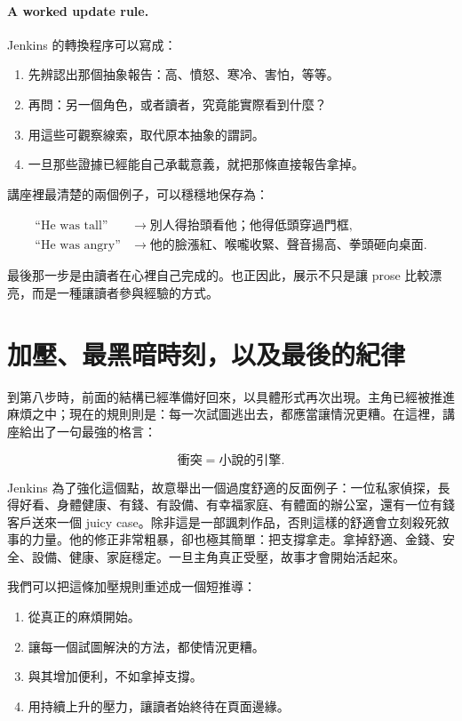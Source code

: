 \paragraph{A worked update rule.} Jenkins 的轉換程序可以寫成：

\begin{enumerate}
\item 先辨認出那個抽象報告：高、憤怒、寒冷、害怕，等等。
\item 再問：另一個角色，或者讀者，究竟能實際看到什麼？
\item 用這些可觀察線索，取代原本抽象的謂詞。
\item 一旦那些證據已經能自己承載意義，就把那條直接報告拿掉。
\end{enumerate}

講座裡最清楚的兩個例子，可以穩穩地保存為：

\begin{align}
\text{``He was tall''} &\to \text{別人得抬頭看他；他得低頭穿過門框},\\
\text{``He was angry''} &\to \text{他的臉漲紅、喉嚨收緊、聲音揚高、拳頭砸向桌面}.
\end{align}

最後那一步是由讀者在心裡自己完成的。也正因此，展示不只是讓 prose 比較漂亮，而是一種讓讀者參與經驗的方式。

\section{加壓、最黑暗時刻，以及最後的紀律}

到第八步時，前面的結構已經準備好回來，以具體形式再次出現。主角已經被推進麻煩之中；現在的規則則是：每一次試圖逃出去，都應當讓情況更糟。在這裡，講座給出了一句最強的格言：

\begin{equation}
\text{衝突}=\text{小說的引擎}.
\end{equation}

Jenkins 為了強化這個點，故意舉出一個過度舒適的反面例子：一位私家偵探，長得好看、身體健康、有錢、有設備、有幸福家庭、有體面的辦公室，還有一位有錢客戶送來一個 juicy case。除非這是一部諷刺作品，否則這樣的舒適會立刻殺死敘事的力量。他的修正非常粗暴，卻也極其簡單：把支撐拿走。拿掉舒適、金錢、安全、設備、健康、家庭穩定。一旦主角真正受壓，故事才會開始活起來。

我們可以把這條加壓規則重述成一個短推導：

\begin{enumerate}
\item 從真正的麻煩開始。
\item 讓每一個試圖解決的方法，都使情況更糟。
\item 與其增加便利，不如拿掉支撐。
\item 用持續上升的壓力，讓讀者始終待在頁面邊緣。
\end{enumerate}

